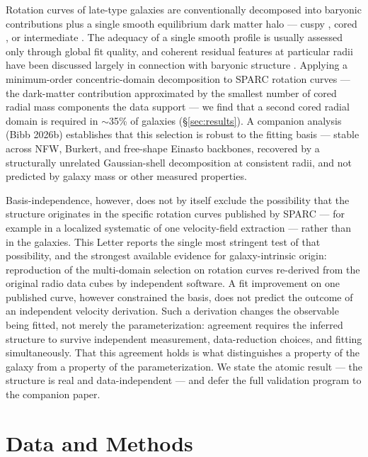 \documentclass[twocolumn]{aastex701}
\begin{document}
Rotation curves of late-type galaxies are conventionally decomposed into
baryonic contributions plus a single smooth equilibrium dark matter halo ---
cuspy \citep[NFW;][]{Navarro1996}, cored \citep[Burkert;][]{Burkert1995}, or
intermediate \citep[Einasto;][]{Einasto1965}. The adequacy of a single smooth
profile is usually assessed only through global fit quality, and coherent
residual features at particular radii have been discussed largely in connection
with baryonic structure \citep[``Renzo's rule'';][]{Sancisi2004}. Applying a
minimum-order concentric-domain decomposition to SPARC rotation curves
\citep{Lelli2016} --- the dark-matter contribution approximated by the smallest number
of cored radial mass components the data support --- we find that a second cored radial
domain is required in $\sim$35\% of galaxies (\S\ref{sec:results}). A companion
analysis (Bibb 2026b) establishes that this selection is robust to the fitting basis
--- stable across NFW, Burkert, and free-shape Einasto backbones, recovered by a
structurally unrelated Gaussian-shell decomposition at consistent radii, and not
predicted by galaxy mass or other measured properties.

Basis-independence, however, does not by itself exclude the possibility that the
structure originates in the specific rotation curves published by SPARC --- for
example in a localized systematic of one velocity-field extraction --- rather
than in the galaxies. This Letter reports the single most stringent test of that
possibility, and the strongest available evidence for galaxy-intrinsic origin:
reproduction of the multi-domain selection on rotation curves re-derived from the
original radio data cubes by independent software. A fit improvement on one
published curve, however constrained the basis, does not predict the outcome of
an independent velocity derivation. Such a derivation changes the observable being
fitted, not merely the parameterization: agreement requires the inferred structure to
survive independent measurement, data-reduction choices, and fitting simultaneously.
That this agreement holds is what distinguishes a property of the galaxy from a property
of the parameterization. We state the atomic result --- the
structure is real and data-independent --- and defer the full validation program
to the companion paper.

\section{Data and Methods} \label{sec:methods}
\end{document}
